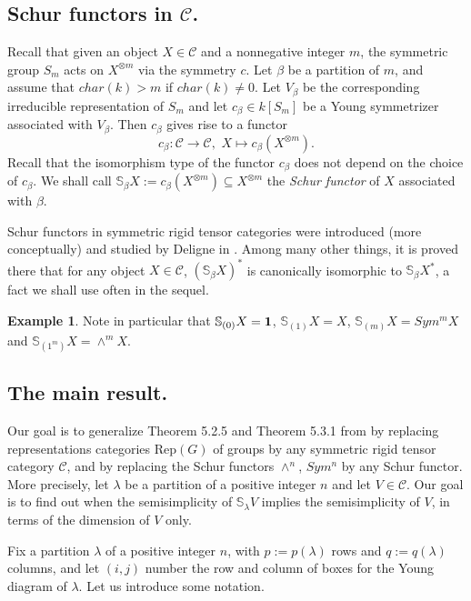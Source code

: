 \documentclass{amsart}
\theoremstyle{definition}
\newtheorem{example}[theorem]{Example}
\newcommand{\Rep}{\text{Rep}}
\newcommand{\ot}{\otimes}
\newcommand{\C}{{\mathcal C}}
\newcommand{\unit}{{\bf 1}}
\begin{document}
\subsection{Schur functors in $\C$.}
Recall that given an object $X\in \C$ and a nonnegative integer $m$,
the symmetric group $S_m$ acts on $X^{\ot m}$ via the symmetry $c$.
Let $\beta$ be a partition of $m$, and assume that $char(k)>m$ if
$char(k)\ne 0$. Let $V_{\beta}$ be the corresponding irreducible
representation of $S_m$ and let $c_{\beta}\in k[S_m]$ be a Young
symmetrizer associated with $V_{\beta}$. Then $c_{\beta}$ gives rise
to a functor
$$c_{\beta}:\C\to \C,\,\,X\mapsto c_{\beta}(X^{\otimes
m}).$$ Recall that the isomorphism type of the functor $c_{\beta}$
does not depend on the choice of $c_{\beta}$. We shall call
$\mathbb{S}_{\beta}X:=c_{\beta}(X^{\otimes m})\subseteq X^{\otimes
m}$ the {\em Schur functor} of $X$ associated with $\beta$.

Schur functors in symmetric rigid tensor categories were introduced
(more conceptually) and studied by Deligne in \cite{d2}. Among many
other things, it is proved there that for any object $X\in \C$,
$(\mathbb{S}_{\beta}X)^*$ is canonically isomorphic to
$\mathbb{S}_{\beta}X^*$, a fact we shall use often in the sequel.

\begin{example}
Note in particular that $\mathbb{S}_{(0)}X=\unit$,
$\mathbb{S}_{(1)}X=X$, $\mathbb{S}_{(m)}X= Sym^mX$ and
$\mathbb{S}_{(1^m)}X= \wedge^mX$.
\end{example}

\subsection{The main result.}
Our goal is to generalize Theorem 5.2.5 and Theorem 5.3.1 from
\cite{s1} by replacing representations categories $\Rep(G)$ of
groups by any symmetric rigid tensor category $\C$, and by replacing
the Schur functors $\wedge^n$, $Sym^n$ by any Schur functor. More
precisely, let $\lambda$ be a partition of a positive integer $n$
and let $V\in \C$. Our goal is to find out when the semisimplicity
of $\mathbb{S}_{\lambda}V$ implies the semisimplicity of $V$, in
terms of the dimension of $V$ only.

Fix a partition $\lambda$ of a positive integer $n$, with
$p:=p(\lambda)$ rows and $q:=q(\lambda)$ columns, and let $(i,j)$
number the row and column of boxes for the Young diagram of
$\lambda$. Let us introduce some notation.
\end{document}
